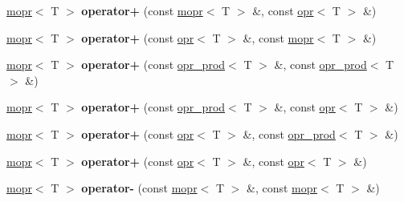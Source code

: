 \begin{DoxyCompactItemize}
\mbox{\label{classqbasis_1_1mopr_abc83029f44d8c45cd895bf4e7a9d058c}} 
\hyperlink{classqbasis_1_1mopr}{mopr}$<$ T $>$ {\bfseries operator+} (const \hyperlink{classqbasis_1_1mopr}{mopr}$<$ T $>$ \&, const \hyperlink{classqbasis_1_1opr}{opr}$<$ T $>$ \&)
\item 
\mbox{\label{classqbasis_1_1mopr_ae2723ea0dc3e69d660a0ec349d90a4b7}} 
\hyperlink{classqbasis_1_1mopr}{mopr}$<$ T $>$ {\bfseries operator+} (const \hyperlink{classqbasis_1_1opr}{opr}$<$ T $>$ \&, const \hyperlink{classqbasis_1_1mopr}{mopr}$<$ T $>$ \&)
\item 
\mbox{\label{classqbasis_1_1mopr_ad3cdd0889b973c9c9048f6c6529382de}} 
\hyperlink{classqbasis_1_1mopr}{mopr}$<$ T $>$ {\bfseries operator+} (const \hyperlink{classqbasis_1_1opr__prod}{opr\+\_\+prod}$<$ T $>$ \&, const \hyperlink{classqbasis_1_1opr__prod}{opr\+\_\+prod}$<$ T $>$ \&)
\item 
\mbox{\label{classqbasis_1_1mopr_ab8759c11cf1362e5bc17a6def299f528}} 
\hyperlink{classqbasis_1_1mopr}{mopr}$<$ T $>$ {\bfseries operator+} (const \hyperlink{classqbasis_1_1opr__prod}{opr\+\_\+prod}$<$ T $>$ \&, const \hyperlink{classqbasis_1_1opr}{opr}$<$ T $>$ \&)
\item 
\mbox{\label{classqbasis_1_1mopr_a301e4b93f29e6046aefab1258eb6cd5a}} 
\hyperlink{classqbasis_1_1mopr}{mopr}$<$ T $>$ {\bfseries operator+} (const \hyperlink{classqbasis_1_1opr}{opr}$<$ T $>$ \&, const \hyperlink{classqbasis_1_1opr__prod}{opr\+\_\+prod}$<$ T $>$ \&)
\item 
\mbox{\label{classqbasis_1_1mopr_af275dbf10346a8863571386f217082e7}} 
\hyperlink{classqbasis_1_1mopr}{mopr}$<$ T $>$ {\bfseries operator+} (const \hyperlink{classqbasis_1_1opr}{opr}$<$ T $>$ \&, const \hyperlink{classqbasis_1_1opr}{opr}$<$ T $>$ \&)
\item 
\mbox{\label{classqbasis_1_1mopr_ae48f7c48bb20b3bafc3a18316275657c}} 
\hyperlink{classqbasis_1_1mopr}{mopr}$<$ T $>$ {\bfseries operator-\/} (const \hyperlink{classqbasis_1_1mopr}{mopr}$<$ T $>$ \&, const \hyperlink{classqbasis_1_1mopr}{mopr}$<$ T $>$ \&)
\item 

\end{DoxyCompactItemize}
